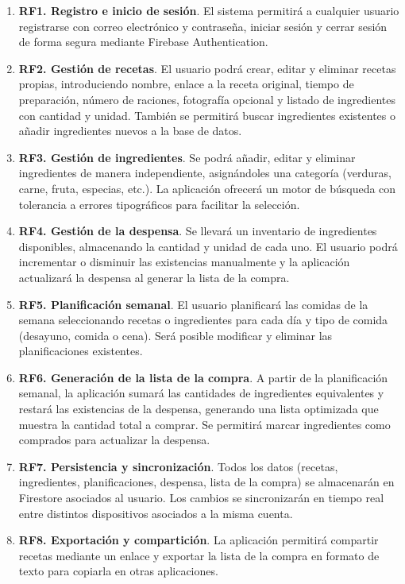 \documentclass[twoside, openright, 11pt]{report}
\begin{document}
\begin{enumerate}
  \item \textbf{RF1. Registro e inicio de sesión}. El sistema permitirá a cualquier usuario registrarse con correo electrónico y contraseña, iniciar sesión y cerrar sesión de forma segura mediante Firebase Authentication.
  \item \textbf{RF2. Gestión de recetas}. El usuario podrá crear, editar y eliminar recetas propias, introduciendo nombre, enlace a la receta original, tiempo de preparación, número de raciones, fotografía opcional y listado de ingredientes con cantidad y unidad. También se permitirá buscar ingredientes existentes o añadir ingredientes nuevos a la base de datos.
  \item \textbf{RF3. Gestión de ingredientes}. Se podrá añadir, editar y eliminar ingredientes de manera independiente, asignándoles una categoría (verduras, carne, fruta, especias, etc.). La aplicación ofrecerá un motor de búsqueda con tolerancia a errores tipográficos para facilitar la selección.
  \item \textbf{RF4. Gestión de la despensa}. Se llevará un inventario de ingredientes disponibles, almacenando la cantidad y unidad de cada uno. El usuario podrá incrementar o disminuir las existencias manualmente y la aplicación actualizará la despensa al generar la lista de la compra.
  \item \textbf{RF5. Planificación semanal}. El usuario planificará las comidas de la semana seleccionando recetas o ingredientes para cada día y tipo de comida (desayuno, comida o cena). Será posible modificar y eliminar las planificaciones existentes.
  \item \textbf{RF6. Generación de la lista de la compra}. A partir de la planificación semanal, la aplicación sumará las cantidades de ingredientes equivalentes y restará las existencias de la despensa, generando una lista optimizada que muestra la cantidad total a comprar. Se permitirá marcar ingredientes como comprados para actualizar la despensa.
  \item \textbf{RF7. Persistencia y sincronización}. Todos los datos (recetas, ingredientes, planificaciones, despensa, lista de la compra) se almacenarán en Firestore asociados al usuario. Los cambios se sincronizarán en tiempo real entre distintos dispositivos asociados a la misma cuenta.
  \item \textbf{RF8. Exportación y compartición}. La aplicación permitirá compartir recetas mediante un enlace y exportar la lista de la compra en formato de texto para copiarla en otras aplicaciones.
\end{enumerate}
\end{document}
